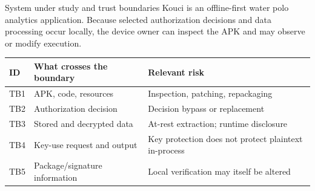 \documentclass[final]{beamer}
\newlength{\colwidth}
\begin{document}
\begin{frame}[t]
\begin{columns}[t]
\begin{column}{\colwidth}
\begin{block}{System under study and trust boundaries}
  Kouci is an offline-first water polo analytics application. Because selected
  authorization decisions and data processing occur locally, the device owner
  can inspect the APK and may observe or modify execution.

  \begin{center}
  \end{center}

  \small
  \begin{tabularx}{\linewidth}{@{}L{2.2cm}Y Y@{}}
    \toprule
    \textbf{ID} & \textbf{What crosses the boundary} & \textbf{Relevant risk} \\
    \midrule
    TB1 & APK, code, resources & Inspection, patching, repackaging \\
    TB2 & Authorization decision & Decision bypass or replacement \\
    TB3 & Stored and decrypted data & At-rest extraction; runtime disclosure \\
    TB4 & Key-use request and output & Key protection does not protect plaintext in-process \\
    TB5 & Package/signature information & Local verification may itself be altered \\
    \bottomrule
  \end{tabularx}
\end{block}



\end{column}
\end{columns}
\end{frame}
\end{document}
